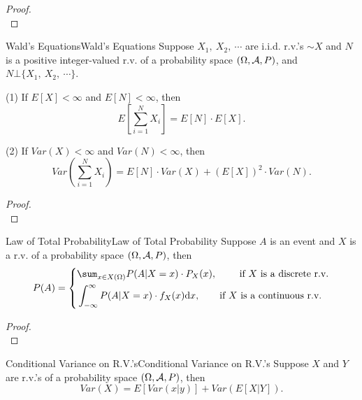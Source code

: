 \documentclass{elegantbook}
\begin{document}
\begin{proof}
\\[4cm]\vspace{0.01cm}
\end{proof}

\begin{theorem}{Wald's Equations}{Wald's Equations}
Suppose \(X_{1},\ X_{2},\ \cdots\) are i.i.d. r.v.'s \(\sim X\) and \(N\)
is a positive integer-valued r.v. of a probability space $(\Omega,\mathcal{A}, P)$, and \(N\bot\{ X_{1},\ X_{2},\ \cdots\}\).

(1) If \(E[X] < \infty\) and
\(E\left\lbrack N \right\rbrack < \infty\), then
\[E\left\lbrack \sum_{i = 1}^{N}X_{i} \right\rbrack = E\left\lbrack N \right\rbrack \cdot E[X].\]

(2) If \(Var(X) < \infty\) and \(Var(N) < \infty\), then
\[Var\left( \sum_{i = 1}^{N}X_{i} \right) = E[N] \cdot Var(X) + \left( E[X] \right)^{2} \cdot Var(N).\]
\end{theorem}

\begin{proof}
\\[4cm]\vspace{0.01cm}
\end{proof}

\begin{theorem}{Law of Total Probability}{Law of Total Probability}
Suppose \(A\) is an event and \(X\) is a r.v. of a probability space $(\Omega,\mathcal{A}, P)$, then
\[P(A) = \left\{ \begin{aligned}
&\sum_{x \in X(\Omega)}^{}{P(A|X = x) \cdot P_{X}(x)},\qquad\ \mathrm{\text{if\ }}X\mathrm{\text{\ is\ a\ discrete\ r.v.}}\\
&\int_{- \infty}^{\infty} P( A | X = x ) \cdot f_{X}( x )\dif x,\qquad\text{if\ }X\text{\ is\ a\ continuous\ r.v.} \\
\end{aligned} \right.\]
\end{theorem}

\begin{proof}
\\[4cm]\vspace{0.01cm}
\end{proof}

\begin{theorem}{Conditional Variance on R.V.'s}{Conditional Variance on R.V.'s}
Suppose \(X\) and \(Y\) are r.v.'s of a probability space $(\Omega,\mathcal{A}, P)$, then
\[Var(X) = E[Var(x|y)] + Var(E[X | Y]).\]
\vspace{0.01cm}
\end{theorem}
\end{document}
